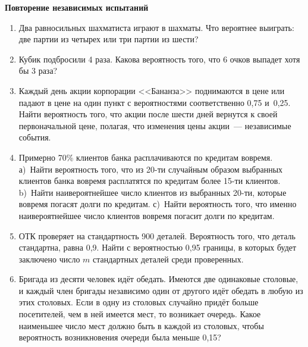 \documentclass[a4paper,14pt]{extarticle}
\begin{document}
{\centering 
{
\bfseries Повторение независимых испытаний\par}
\begin{enumerate}
    \item Два равносильных шахматиста играют в шахматы. Что вероятнее выиграть: две партии из четырех или три партии из шести?

\item Кубик подбросили 4 раза. Какова вероятность того, что 6 очков выпадет хотя бы 3 раза?



\item Каждый день акции корпорации <<Бананза>> поднимаются в цене или падают в цене на один пункт с вероятностями соответственно 0,75 и~0,25. Найти вероятность того, что акции после шести дней вернутся к своей первоначальной цене, полагая, что изменения цены акции~--- независимые события.

\item Примерно 70\% клиентов банка расплачиваются по кредитам вовремя. а)~Найти вероятность того, что из 20-ти случайным образом выбранных клиентов банка вовремя расплатятся по кредитам более 15-ти клиентов.
b)~Найти наивероятнейшее число клиентов из выбранных 20-ти, которые вовремя погасят долги по кредитам. с)~Найти вероятность того, что именно наивероятнейшее число клиентов вовремя погасит долги по кредитам.

\item ОТК проверяет на стандартность 900 деталей. Вероятность того, что деталь стандартна, равна 0,9. Найти с вероятностью 0,95 границы, в которых будет заключено число $m$ стандартных деталей среди проверенных.


\item Бригада из десяти человек идёт обедать. Имеются две одинаковые столовые, и каждый член бригады независимо один от другого идёт обедать в любую из этих столовых. Если в одну из столовых случайно придёт больше посетителей, чем в ней имеется мест, то возникает очередь. Какое наименьшее число мест должно быть в каждой из столовых, чтобы вероятность возникновения очереди была меньше 0,15?


\end{enumerate}}
\end{document}
